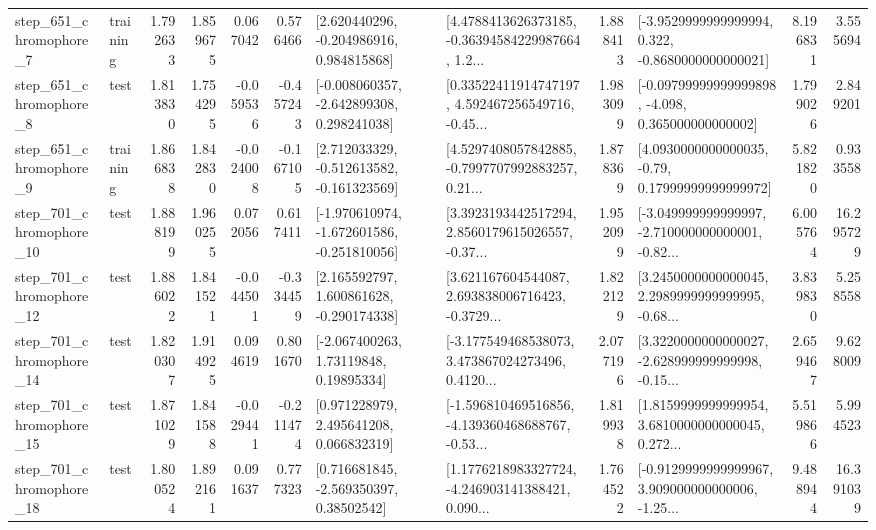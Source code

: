 \begin{tabular}{llrrrrllrlrr}
   step\_651\_chromophore\_7 &  training &      1.792633 &    1.859675 &      0.067042 &  0.576466 &    [2.620440296, -0.204986916, 0.984815868] &  [4.4788413626373185, -0.36394584229987664, 1.2... &       1.888413 &  [-3.9529999999999994, 0.322, -0.8680000000000021] &            8.196831 &          3.555694 \\
   step\_651\_chromophore\_8 &      test &      1.813830 &    1.754295 &     -0.059536 & -0.457243 &   [-0.008060357, -2.642899308, 0.298241038] &  [0.33522411914747197, 4.592467256549716, -0.45... &       1.983099 &  [-0.09799999999999898, -4.098, 0.365000000000002] &            1.799026 &          2.849201 \\
   step\_651\_chromophore\_9 &  training &      1.866838 &    1.842830 &     -0.024008 & -0.167105 &   [2.712033329, -0.512613582, -0.161323569] &  [4.5297408057842885, -0.7997707992883257, 0.21... &       1.878369 &   [4.0930000000000035, -0.79, 0.17999999999999972] &            5.821820 &          0.933558 \\
  step\_701\_chromophore\_10 &      test &      1.888199 &    1.960255 &      0.072056 &  0.617411 &  [-1.970610974, -1.672601586, -0.251810056] &  [3.3923193442517294, 2.8560179615026557, -0.37... &       1.952099 &  [-3.049999999999997, -2.710000000000001, -0.82... &            6.005764 &         16.295729 \\
  step\_701\_chromophore\_12 &      test &      1.886022 &    1.841521 &     -0.044501 & -0.334459 &    [2.165592797, 1.600861628, -0.290174338] &  [3.621167604544087, 2.693838006716423, -0.3729... &       1.822129 &  [3.2450000000000045, 2.2989999999999995, -0.68... &            3.839830 &          5.258558 \\
  step\_701\_chromophore\_14 &      test &      1.820307 &    1.914925 &      0.094619 &  0.801670 &      [-2.067400263, 1.73119848, 0.19895334] &  [-3.177549468538073, 3.473867024273496, 0.4120... &       2.077196 &  [3.3220000000000027, -2.628999999999998, -0.15... &            2.659467 &          9.628009 \\
  step\_701\_chromophore\_15 &      test &      1.871029 &    1.841588 &     -0.029441 & -0.211474 &     [0.971228979, 2.495641208, 0.066832319] &  [-1.596810469516856, -4.139360468688767, -0.53... &       1.819938 &  [1.8159999999999954, 3.6810000000000045, 0.272... &            5.519866 &          5.994523 \\
  step\_701\_chromophore\_18 &      test &      1.800524 &    1.892161 &      0.091637 &  0.777323 &     [0.716681845, -2.569350397, 0.38502542] &  [1.1776218983327724, -4.246903141388421, 0.090... &       1.764522 &  [-0.9129999999999967, 3.909000000000006, -1.25... &            9.488944 &         16.391039 \\

\end{tabular}
